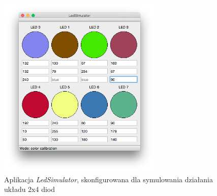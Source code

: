 \documentclass[eng,printmode]{mgr}
\begin{document}
\begin{figure}[!ht]
    \centering
    \includegraphics[width=0.7\textwidth]{Figures/ledSimulator3.png} 
    \caption{Aplikacja \emph{LedSimulator}, skonfigurowana dla symulowania działania układu 2x4 diod}
    \label{fig:ledSimulator3}
\end{figure}


\listoffigures
\nocite{*}

\end{document}
